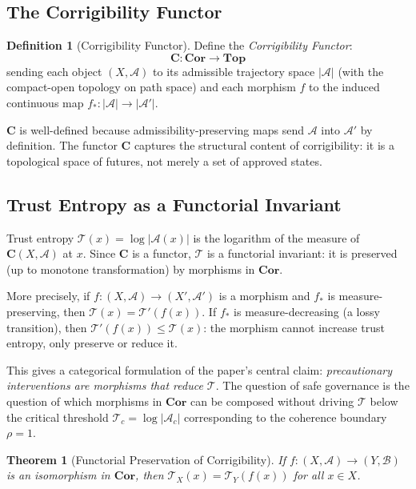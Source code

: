 \documentclass[11pt,a4paper]{article}
\theoremstyle{definition}
\newtheorem{definition}{Definition}
\theoremstyle{plain}
\newtheorem{theorem}{Theorem}
\begin{document}
\begin{mdframed}[style=appendixbox]
\subsection{The Corrigibility Functor}

\begin{definition}[Corrigibility Functor]
Define the \emph{Corrigibility Functor}:
\[
\mathbf{C} : \mathbf{Cor} \to \mathbf{Top}
\]
sending each object $(X, \mathcal{A})$ to its admissible trajectory space $|\mathcal{A}|$ (with the compact-open topology on path space) and each morphism $f$ to the induced continuous map $f_* : |\mathcal{A}| \to |\mathcal{A}'|$.
\end{definition}

$\mathbf{C}$ is well-defined because admissibility-preserving maps send $\mathcal{A}$ into $\mathcal{A}'$ by definition. The functor $\mathbf{C}$ captures the structural content of corrigibility: it is a topological space of futures, not merely a set of approved states.

\subsection{Trust Entropy as a Functorial Invariant}

Trust entropy $\mathcal{T}(x) = \log|\mathcal{A}(x)|$ is the logarithm of the measure of $\mathbf{C}(X, \mathcal{A})$ at $x$. Since $\mathbf{C}$ is a functor, $\mathcal{T}$ is a functorial invariant: it is preserved (up to monotone transformation) by morphisms in $\mathbf{Cor}$.

More precisely, if $f : (X, \mathcal{A}) \to (X', \mathcal{A}')$ is a morphism and $f_*$ is measure-preserving, then $\mathcal{T}(x) = \mathcal{T}'(f(x))$. If $f_*$ is measure-decreasing (a lossy transition), then $\mathcal{T}'(f(x)) \leq \mathcal{T}(x)$: the morphism cannot increase trust entropy, only preserve or reduce it.

This gives a categorical formulation of the paper's central claim: \emph{precautionary interventions are morphisms that reduce $\mathcal{T}$}. The question of safe governance is the question of which morphisms in $\mathbf{Cor}$ can be composed without driving $\mathcal{T}$ below the critical threshold $\mathcal{T}_c = \log|\mathcal{A}_c|$ corresponding to the coherence boundary $\rho = 1$.

\begin{theorem}[Functorial Preservation of Corrigibility]
If $f : (X, \mathcal{A}) \to (Y, \mathcal{B})$ is an isomorphism in $\mathbf{Cor}$, then $\mathcal{T}_X(x) = \mathcal{T}_Y(f(x))$ for all $x \in X$.
\end{theorem}


\end{mdframed}
\end{document}
